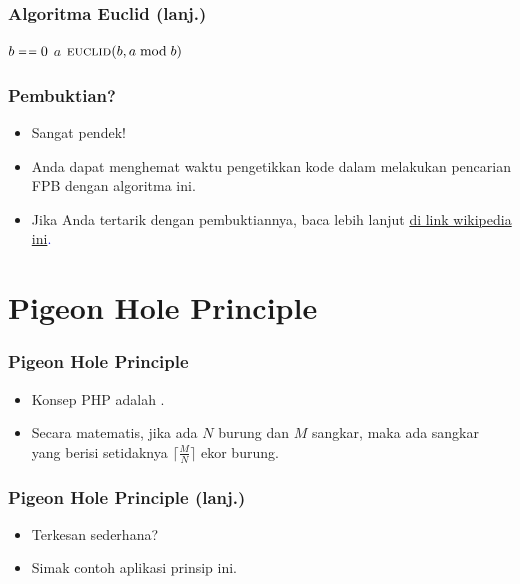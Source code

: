 \begin{frame}[fragile]
\frametitle{Algoritma Euclid (lanj.)}
\begin{codebox}
\li \If $b \isequal 0$
    \Then
\li   \Return $a$
\li \Else
\li   \Return $\textnormal{\scshape euclid}(b, a \bmod b)$ 
    \End
\end{codebox}
\end{frame}

\begin{frame}
\frametitle{Pembuktian?}
\begin{itemize}
  \item Sangat pendek!
  \item Anda dapat menghemat waktu pengetikkan kode dalam melakukan pencarian FPB dengan algoritma ini.
  \item Jika Anda tertarik dengan pembuktiannya, baca lebih lanjut \textcolor{blue}{\href{https://en.wikipedia.org/wiki/Euclidean_algorithm}{di link wikipedia ini}.}
\end{itemize}   
\end{frame}

\section{Pigeon Hole Principle}
\frame{\sectionpage}

\begin{frame}
\frametitle{Pigeon Hole Principle}
\begin{itemize}
  \item Konsep PHP adalah .
  \item Secara matematis, jika ada $N$ burung dan $M$ sangkar, maka ada sangkar yang berisi setidaknya $\big\lceil \frac{M}{N} \big\rceil$ ekor burung.
\end{itemize}
\end{frame}

\begin{frame}
\frametitle{Pigeon Hole Principle (lanj.)}
\begin{itemize}
  \item Terkesan sederhana?
  \item Simak contoh aplikasi prinsip ini.
\end{itemize}
\end{frame}


